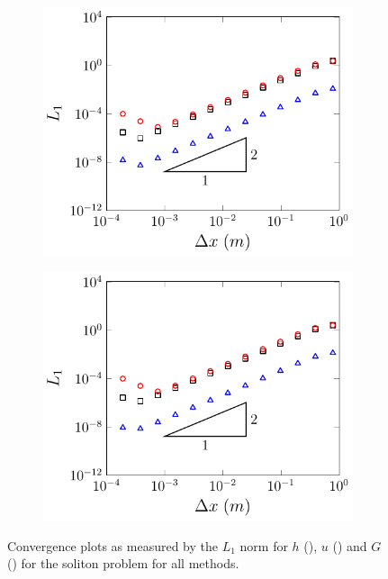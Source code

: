 \begin{figure}
\begin{subfigure}{0.5\textwidth}
		\vspace{0.5cm}
	\end{subfigure}
	\begin{subfigure}{0.5\textwidth}
		\includegraphics[width=\textwidth]{./chp5/figures/Analytic/Soliton/L1/D.pdf}
		\vspace{0.5cm}
	\end{subfigure}%
	\begin{subfigure}{0.5\textwidth}
		\includegraphics[width=\textwidth]{./chp5/figures/Analytic/Soliton/L1/W.pdf}
		\vspace{0.5cm}
	\end{subfigure}
	\caption{Convergence plots as measured by the $L_1$ norm for $h$ (), $u$ () and $G$ () for the soliton problem for all methods.}
	\label{fig:SolitonL1All}
\end{figure}

